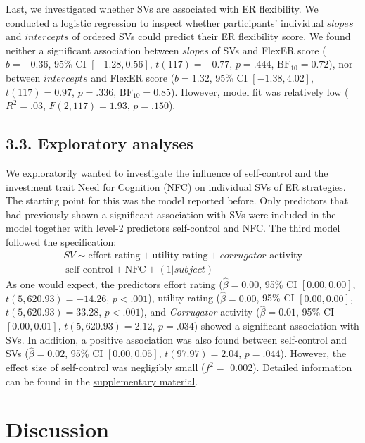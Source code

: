 \documentclass[
  man,floatsintext]{apa6}
\begin{document}
Last, we investigated whether SVs are associated with ER flexibility.
We conducted a logistic regression to inspect whether participants' individual \(slopes\) and \(intercepts\) of ordered SVs could predict their ER flexibility score.
We found neither a significant association between \(slopes\) of SVs and FlexER score (\(b = -0.36\), 95\% CI \([-1.28, 0.56]\), \(t(117) = -0.77\), \(p = .444\), \(\mathrm{BF}_{\textrm{10}} = 0.72\)), nor between \(intercepts\) and FlexER score (\(b = 1.32\), 95\% CI \([-1.38, 4.02]\), \(t(117) = 0.97\), \(p = .336\), \(\mathrm{BF}_{\textrm{10}} = 0.85\)).
However, model fit was relatively low (\(R^2 = .03\), \(F(2, 117) = 1.93\), \(p = .150\)).

\hypertarget{exploratory-analyses}{%
\subsection{3.3. Exploratory analyses}\label{exploratory-analyses}}

We exploratorily wanted to investigate the influence of self-control and the investment trait Need for Cognition (NFC) on individual SVs of ER strategies.
The starting point for this was the model reported before.
Only predictors that had previously shown a significant association with SVs were included in the model together with level-2 predictors self-control and NFC.
The third model followed the specification:
\[
\begin{split}
SV \sim \text{effort rating} + \text{utility rating} + corrugator \text{ activity} \\\ \text{self-control} + \text{NFC} + (1 |subject)
\end{split}
\]
As one would expect, the predictors effort rating (\(\hat{\beta} = 0.00\), 95\% CI \([0.00, 0.00]\), \(t(5,620.93) = -14.26\), \(p < .001\)), utility rating (\(\hat{\beta} = 0.00\), 95\% CI \([0.00, 0.00]\), \(t(5,620.93) = 33.28\), \(p < .001\)), and \emph{Corrugator} activity (\(\hat{\beta} = 0.01\), 95\% CI \([0.00, 0.01]\), \(t(5,620.93) = 2.12\), \(p = .034\)) showed a significant association with SVs.
In addition, a positive association was also found between self-control and SVs (\(\hat{\beta} = 0.02\), 95\% CI \([0.00, 0.05]\), \(t(97.97) = 2.04\), \(p = .044\)).
However, the effect size of self-control was negligibly small (\(f^{2}=\) 0.002).
Detailed information can be found in the \protect\hyperlink{SupplementExploratory}{supplementary material}.

\hypertarget{discussion}{%
\section{Discussion}\label{discussion}}
\end{document}
